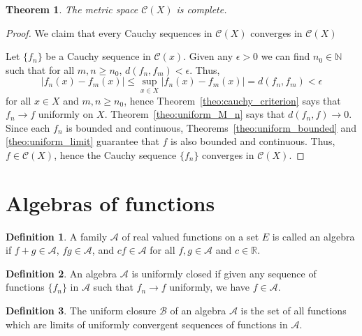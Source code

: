 \documentclass[11pt]{article}
\def\R{\mathbb{R}}
\def\N{\mathbb{N}}
\newtheorem{theorem}{Theorem}[section]
\theoremstyle{definition}
\newtheorem{definition}{Definition}[section]
\theoremstyle{remark}
\begin{document}
    \begin{theorem}
        The metric space $\mathscr{C}(X)$ is complete.
    \end{theorem}
    \begin{proof}
        We claim that every Cauchy sequences in $\mathscr{C}(X)$ converges in
        $\mathscr{C}(X)$

        Let $\{f_n\}$ be a Cauchy sequence in $\mathscr{C}(x)$. Given any $\epsilon >
        0$ we can find $n_0 \in \N$ such that for all $m, n \geq n_0$, $d(f_n, f_m) <
        \epsilon$. Thus, \[
            |f_n(x) - f_m(x)| \leq \sup_{x \in X} |f_n(x) - f_m(x)| = d(f_n, f_m)<
            \epsilon
        \] for all $x \in X$ and $m, n \geq n_0$, hence
        Theorem~\ref{theo:cauchy_criterion} says that $f_n \to f$ uniformly on $X$.
        Theorem~\ref{theo:uniform_M_n} says that $d(f_n, f) \to 0$.  Since each $f_n$
        is bounded and continuous, Theorems~\ref{theo:uniform_bounded} and
        \ref{theo:uniform_limit} guarantee that $f$ is also bounded and continuous.
        Thus, $f \in \mathscr{C}(X)$, hence the Cauchy sequence $\{f_n\}$ converges
        in $\mathscr{C}(X)$.
    \end{proof}

    \section{Algebras of functions}
    \begin{definition}
        A family $\mathscr{A}$ of real valued functions on a set $E$ is called an
        algebra if $f + g \in \mathscr{A}$, $fg \in \mathscr{A}$, and $cf \in
        \mathscr{A}$ for all $f, g\in \mathscr{A}$ and $c \in \R$.
    \end{definition}

    \begin{definition}
        An algebra $\mathscr{A}$ is uniformly closed if given any sequence of
        functions $\{f_n\}$ in $\mathscr{A}$ such that $f_n \to f$ uniformly, we have
        $f \in \mathscr{A}$.
    \end{definition}

    \begin{definition}
        The uniform closure $\mathscr{B}$ of an algebra $\mathscr{A}$ is the set of
        all functions which are limits of uniformly convergent sequences of functions
        in $\mathscr{A}$.
    \end{definition}
\end{document}
